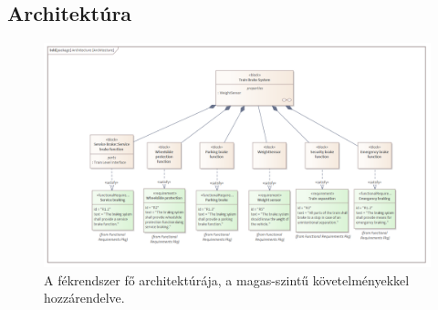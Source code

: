 \chapter{\modeling}
\section{Architektúra}

\begin{figure}
    \centering
    \includegraphics[width=150mm, keepaspectratio]{figures/Architecture.png}
    \caption{A fékrendszer fő architektúrája, a magas-szintű követelményekkel hozzárendelve.}
    \label{fig:architecture}
\end{figure}